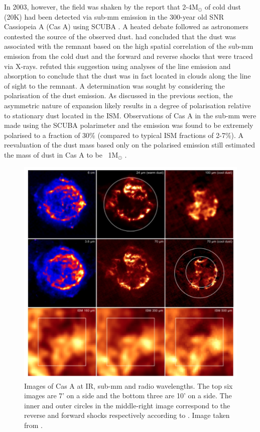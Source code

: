 In 2003, however, the field was shaken by the report that 2-4M$_{\odot}$ of cold dust (20K) had been detected via sub-mm emission in the 300-year old SNR Cassiopeia A (Cas A) using SCUBA \citep{Dunne2003}.   A heated debate followed as astronomers contested the source of the observed dust.  \citet{Dunne2003} had concluded that the dust was associated with the remnant based on the high spatial correlation of the sub-mm emission from the cold dust and the forward and reverse shocks that were traced via X-rays. \citet{Krause2004} refuted this suggestion using analyses of the line emission and absorption to conclude that the dust was in fact located in clouds along the line of sight to the remnant.  A determination was sought by considering the polarisation of the dust emission.  As discussed in the previous section, the asymmetric nature of expansion likely results in a degree of polarisation relative to stationary dust located in the ISM.  Observations of Cas A in the sub-mm were made using the SCUBA polarimeter and the emission was found to be extremely polarised to a fraction of 30\% (compared to typical ISM fractions of 2-7\%).  A reevaluation of the dust mass based only on the polarised emission still estimated the mass of dust in Cas A to be ~1M$_{\odot}$ \citep{Dunne2009}.

\begin{figure}
\centering
\includegraphics[clip=true,scale=0.425,trim= 0 0 0 0]{chapters/chapter1/figs/CasA.png}
\caption{Images of Cas A at IR, sub-mm and radio wavelengths.  The top six images are 7' on a side and the bottom three are 10' on a side.  The inner and outer circles in the middle-right image correspond to the reverse and forward shocks respectively according to \citep{Gotthelf2001}.  Image taken from \citet{Barlow2010}.}
\label{fig:CasA}
\end{figure}


